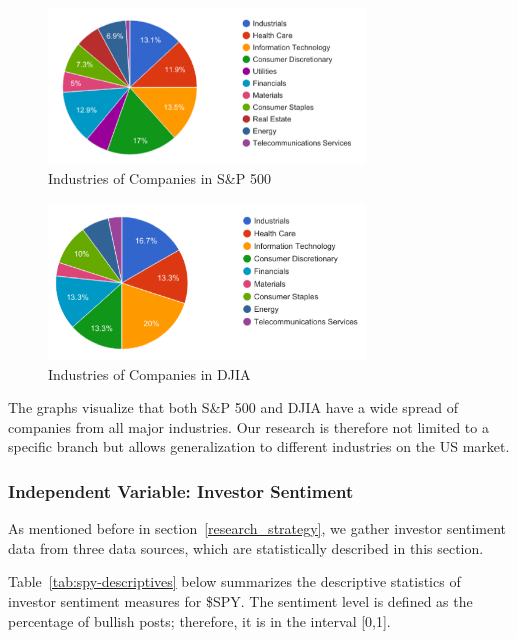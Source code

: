 \begin{figure}[ht]
\centering
\includegraphics[width=0.75\textwidth]{figures/figure2.png}
\caption{\label{fig:figure2}Industries of Companies in S\&P 500}
\end{figure}

\begin{figure}[ht]
\centering
\includegraphics[width=0.75\textwidth]{figures/figure3.png}
\caption{\label{fig:figure3}Industries of Companies in DJIA}
\end{figure}

The graphs visualize that both S\&P 500 and DJIA have a wide spread of companies from all major industries. Our research is therefore not limited to a specific branch but allows generalization to different industries on the US market.

\newpage

\subsubsection{Independent Variable: Investor Sentiment}
As mentioned before in section~\ref{research_strategy}, we gather investor sentiment data from three data sources, which are statistically described in this section.
\par
Table~\ref{tab:spy-descriptives} below summarizes the descriptive statistics of investor sentiment measures for \$SPY. The sentiment level is defined as the percentage of bullish posts; therefore, it is in the interval [0,1].



